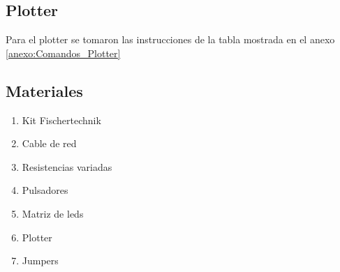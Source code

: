 \subsection{Plotter}

Para el plotter se tomaron las instrucciones de la tabla mostrada en el anexo \ref{anexo:Comandos_Plotter}


\subsection{Materiales}
\begin{enumerate}
    \item Kit Fischertechnik
    \item Cable de red
    \item Resistencias variadas
    \item Pulsadores
    \item Matriz de leds
    \item Plotter 
    \item Jumpers
\end{enumerate}